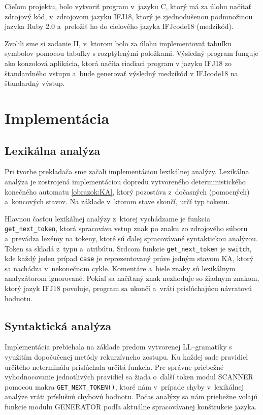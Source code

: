\documentclass[a4paper, 11pt]{article}
\begin{document}
Cieľom projektu, bolo vytvoriť program v~jazyku C, ktorý má za úlohu načítať zdrojový kód, v~zdrojovom jazyku IFJ18, ktorý je zjednodušenou podmnožinou jazyka Ruby 2.0 a~preložiť ho do cieľového jazyka IFJcode18 (medzikód). 

Zvolili sme si zadanie II, v~ktorom bolo za úlohu implementovať tabuľku symbolov pomocou tabuľky s rozptýlenými položkami.
Výsledný program funguje ako konzolová aplikácia, ktorá načíta riadiaci program v jazyku IFJ18 zo štandardného vstupu a~bude generovať výsledný medzikód v IFJcode18 na štandardný výstup.
\section{Implementácia}

\subsection{Lexikálna analýza}
Pri tvorbe prekladača sme začali implementáciou lexikálnej analýzy. Lexikálna analýza je zostrojená implementáciou dopredu vytvoreného deterministického konečného  automatu \ref{obrazok:KA}, ktorý pozostáva z~dočasných (pomocných) a~koncových stavov. Na základe v~ktorom stave skončí, určí typ tokenu.

Hlavnou časťou lexikálnej analýzy z~ktorej vychádzame je funkcia \texttt{get\_next\_token}, ktorá spracováva vstup znak po znaku zo zdrojového súboru a~prevádza lexémy na tokeny, ktoré sú ďalej spracovávané syntaktickou analýzou. Token sa skladá z~typu a~atribútu. Srdcom funkcie \texttt{get\_next\_token} je \texttt{switch}, kde každý jeden prípad \texttt{case} je reprezentovaný práve jedným stavom KA, ktorý sa nachádza v~nekonečnom cykle. Komentáre a~biele znaky sú lexikálnym analyzátorom ignorované. Pokiaľ sa načítaný znak nezhoduje so žiadnym znakom, ktorý jazyk IFJ18 povoluje, program sa ukončí a~vráti prislúchajúcu návratovú hodnotu.

\subsection{Syntaktická analýza}
Implementácia prebiehala na základe predom vytvorenej LL--gramatiky s využitím dopočučenej metódy rekurzívneho zostupu. Ku každej sade pravidiel určitého neterminálu prislúchala určitá funkcia. Pre správne priebežné vyhodnocovanie jednotlivých pravidiel sa žiada o~ďalší token modul SCANNER pomocou makra \texttt{GET\_NEXT\_TOKEN()}, ktoré nám v~prípade chyby v~lexikálnej analýze vráti príslušnú chybovú hodnotu. Počas analýzy sa nám priebežne volajú funkcie modulu GENERATOR podľa aktuálne spracovávanej konštrukcie jazyka.
\end{document}
